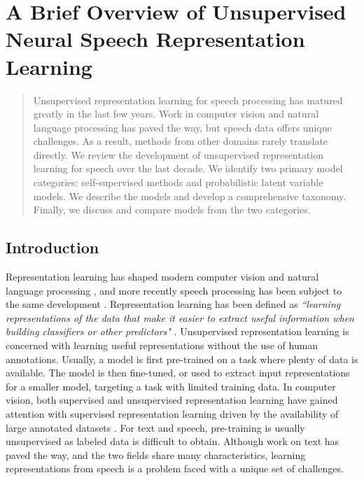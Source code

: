 
\chapter[a brief overview of unsupervised neural speech representation learning]{A Brief Overview of Unsupervised Neural Speech Representation Learning}
\label{app:paper-brief}





\begin{abstract}
Unsupervised representation learning for speech processing has matured greatly in the last few years. Work in computer vision and natural language processing has paved the way, but speech data offers unique challenges. As a result, methods from other domains rarely translate directly. We review the development of unsupervised representation learning for speech over the last decade. We identify two primary model categories: self-supervised methods and probabilistic latent variable models. We describe the models and develop a comprehensive taxonomy. Finally, we discuss and compare models from the two categories.
\end{abstract}


\section{Introduction}
Representation learning has shaped modern computer vision \cite{simonyan2014very} and natural language processing \cite{devlin2019bert}, and more recently speech processing has been subject to the same development \cite{baevski2020wav2vec}. Representation learning has been defined as \emph{``learning representations of the data that make it easier to extract useful information when building classifiers or other predictors"} \cite{bengio_representation_2013}.  
Unsupervised representation learning is concerned with learning useful representations without the use of human annotations. Usually, a model is first pre-trained on a task where plenty of data is available. The model is then fine-tuned, or used to extract input representations for a smaller model, targeting a task with limited training data. In computer vision, both supervised \cite{simonyan2014very, szegedy2015going, he2016deep} and unsupervised \cite{pathak2016context, doersch2015unsupervised} representation learning have gained attention with supervised representation learning driven by the availability of large annotated datasets \cite{deng2009imagenet}. For text and speech, pre-training is usually unsupervised as labeled data is difficult to obtain. Although work on text has paved the way, and the two fields share many characteristics, learning representations from speech is a problem faced with a unique set of challenges.


